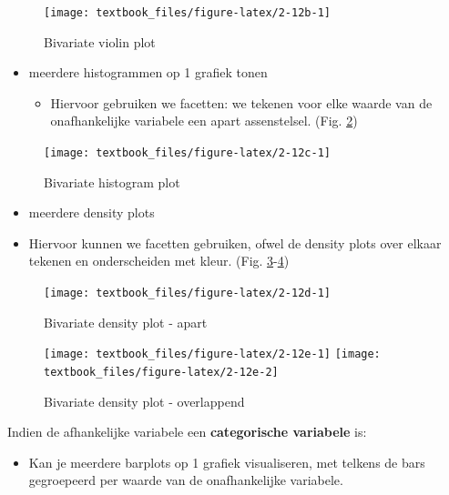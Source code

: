 \documentclass[]{tufte-book}
\providecommand{\tightlist}{%
  \setlength{\itemsep}{0pt}\setlength{\parskip}{0pt}}
\begin{document}
\begin{figure}
\texttt{[image: textbook\_files/figure-latex/2-12b-1]} \caption[Bivariate violin plot]{Bivariate violin plot}\label{fig:2-12b}
\end{figure}

\begin{itemize}
\tightlist
\item
  meerdere histogrammen op 1 grafiek tonen

  \begin{itemize}
  \tightlist
  \item
    Hiervoor gebruiken we facetten: we tekenen voor elke waarde van de onafhankelijke variabele een apart assenstelsel. (Fig. \ref{fig:2-12c})
  \end{itemize}
\end{itemize}

\begin{figure}
\texttt{[image: textbook\_files/figure-latex/2-12c-1]} \caption[Bivariate histogram plot]{Bivariate histogram plot}\label{fig:2-12c}
\end{figure}

\begin{itemize}
\tightlist
\item
  meerdere density plots
\item
  Hiervoor kunnen we facetten gebruiken, ofwel de density plots over elkaar tekenen en onderscheiden met kleur. (Fig. \ref{fig:2-12d}-\ref{fig:2-12e})
\end{itemize}

\begin{figure}
\texttt{[image: textbook\_files/figure-latex/2-12d-1]} \caption[Bivariate density plot - apart]{Bivariate density plot - apart}\label{fig:2-12d}
\end{figure}

\begin{figure}
\texttt{[image: textbook\_files/figure-latex/2-12e-1]} \texttt{[image: textbook\_files/figure-latex/2-12e-2]} \caption[Bivariate density plot - overlappend]{Bivariate density plot - overlappend}\label{fig:2-12e}
\end{figure}

Indien de afhankelijke variabele een \textbf{categorische variabele} is:

\begin{itemize}
\tightlist
\item
  Kan je meerdere barplots op 1 grafiek visualiseren, met telkens de bars gegroepeerd per waarde van de onafhankelijke variabele.
\end{itemize}
\end{document}
